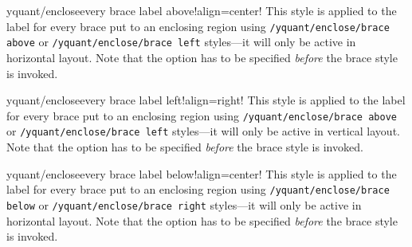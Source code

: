 \documentclass{scrartcl}
\makeatletter
\let\unpatched@minted@inline@iii=\minted@inline@iii%
\def\patched@minted@inline@iii#1{%
      \unpatched@minted@inline@iii{#1}%
      \par%
      \endgroup\egroup\nopagebreak\vskip-\parskip\nopagebreak%
      \noindent\ignorespaces%
   }
\def\patch@mintinline{%
      \let\minted@inline@iii=\patched@minted@inline@iii%
   }
\let\unpatched@RobustMintInlineProcess@ii=\RobustMintInlineProcess@ii
\def\patched@RobustMintInlineProcess@ii#1{%
      \unpatched@RobustMintInlineProcess@ii{#1}%
      \par%
      \endgroup\egroup\nopagebreak\vskip-\parskip\nopagebreak%
      \noindent\ignorespaces%
   }
\def\patch@mintinline{%
      \let\RobustMintInlineProcess@ii=\patched@RobustMintInlineProcess@ii%
   }
\newenvironment{option*}[3][]{\ifhmode\par\fi\addvspace{5mm}%
   \vbox\bgroup\begingroup%
      \patch@mintinline%
      \raggedleft%
      \hspace*{-1cm}%
      \phantomsection\label{yquant:/#2/#3}%
      \texttt{\ifstrempty{#1}\relax{\compat{#1}}\textcolor{gray}{/#2/}\textcolor{mintgreen}{#3}}\hfill default: %
      \tex}{\par\addvspace{5mm}}
\def\ttlink{\link\texttt}
\makeatother
\begin{document}

               \begin{option*}{yquant/enclose}{every brace label above}!align=center!
                  This style is applied to the label for every brace put to an enclosing region using \ttlink{/yquant/enclose/brace above} or \ttlink{/yquant/enclose/brace left} styles---it will only be active in horizontal layout.
                  Note that the option has to be specified \emph{before} the brace style is invoked.
               \end{option*}


               \begin{option*}{yquant/enclose}{every brace label left}!align=right!
                  This style is applied to the label for every brace put to an enclosing region using \ttlink{/yquant/enclose/brace above} or \ttlink{/yquant/enclose/brace left} styles---it will only be active in vertical layout.
                  Note that the option has to be specified \emph{before} the brace style is invoked.
               \end{option*}


               \begin{option*}{yquant/enclose}{every brace label below}!align=center!
                  This style is applied to the label for every brace put to an enclosing region using \ttlink{/yquant/enclose/brace below} or \ttlink{/yquant/enclose/brace right} styles---it will only be active in horizontal layout.
                  Note that the option has to be specified \emph{before} the brace style is invoked.
               \end{option*}
\end{document}
